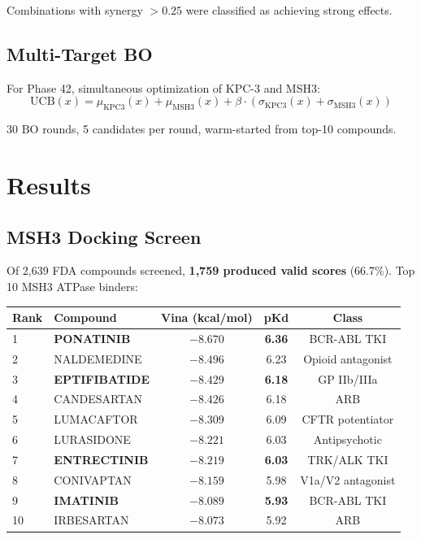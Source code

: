\documentclass[12pt,a4paper]{article}
\begin{document}
Combinations with synergy $> 0.25$ were classified as achieving strong effects.

\subsection{Multi-Target BO}

For Phase 42, simultaneous optimization of KPC-3 and MSH3:
$$\text{UCB}(x) = \mu_{\text{KPC3}}(x) + \mu_{\text{MSH3}}(x) + \beta \cdot (\sigma_{\text{KPC3}}(x) + \sigma_{\text{MSH3}}(x))$$

30 BO rounds, 5 candidates per round, warm-started from top-10 compounds.

\section{Results}

\subsection{MSH3 Docking Screen}

Of 2,639 FDA compounds screened, \textbf{1,759 produced valid scores} (66.7\%). Top 10 MSH3 ATPase binders:

\begin{center}
\begin{tabular}{llccc}
\toprule
Rank & Compound & Vina (kcal/mol) & pKd & Class \\
\midrule
1 & \textbf{PONATINIB} & $-8.670$ & \textbf{6.36} & BCR-ABL TKI \\
2 & NALDEMEDINE & $-8.496$ & 6.23 & Opioid antagonist \\
3 & \textbf{EPTIFIBATIDE} & $-8.429$ & \textbf{6.18} & GP IIb/IIIa \\
4 & CANDESARTAN & $-8.426$ & 6.18 & ARB \\
5 & LUMACAFTOR & $-8.309$ & 6.09 & CFTR potentiator \\
6 & LURASIDONE & $-8.221$ & 6.03 & Antipsychotic \\
7 & \textbf{ENTRECTINIB} & $-8.219$ & \textbf{6.03} & TRK/ALK TKI \\
8 & CONIVAPTAN & $-8.159$ & 5.98 & V1a/V2 antagonist \\
9 & \textbf{IMATINIB} & $-8.089$ & \textbf{5.93} & BCR-ABL TKI \\
10 & IRBESARTAN & $-8.073$ & 5.92 & ARB \\
\bottomrule
\end{tabular}
\end{center}
\end{document}
